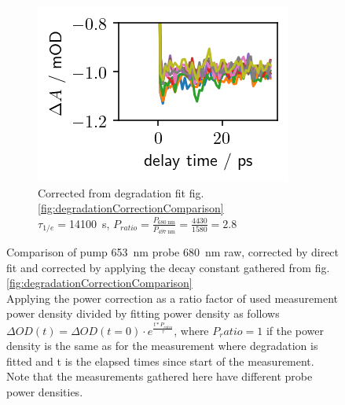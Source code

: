 \documentclass[twoside,openright]{scrreprt}
\begin{document}
\begin{figure}[hbtp]
\begin{subfigure}[t]{0.3215\linewidth}
\includegraphics[width=\columnwidth]{images/PowerVarHigh_CorrEstimate14100_2.8.png} 
\caption{Corrected from degradation fit fig. \ref{fig:degradationCorrectionComparison}\\
$\tau_{1/e}=$\SI{14100}{\second}, $P_{ratio}=\frac{P_{\SI{680}{\nano\meter}}}{P_{\SI{497}{\nano\meter}}} = \frac{4430}{1580}= 2.8$}
\end{subfigure}
\caption{Comparison of pump \SI{653}{\nano\meter} probe \SI{680}{\nano\meter} raw, corrected by direct fit and corrected by applying the decay constant gathered from fig. \ref{fig:degradationCorrectionComparison}\\Applying the power correction as a ratio factor of used measurement power density divided by fitting power density as follows $\Delta OD(t) = \Delta OD(t=0)\cdot e^{\frac{t*P_{ratio}}{\tau}}$, where $P_ratio =1$ if the power density is the same as for the measurement where degradation is fitted and t is the elapsed times since start of the measurement. Note that the measurements gathered here have different probe power densities.\label{fig:powerVarCorrection}}
\end{figure}
\end{document}
